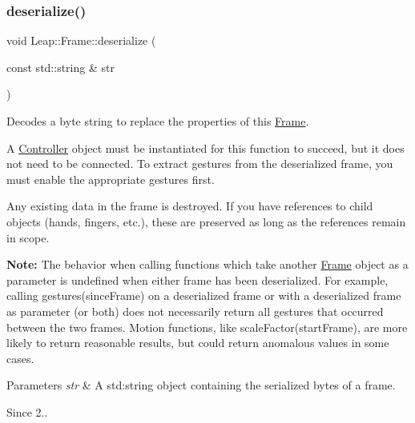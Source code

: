\subsubsection{\texorpdfstring{deserialize()}{deserialize()}}
{\footnotesize\ttfamily void Leap\+::\+Frame\+::deserialize (\begin{DoxyParamCaption}\item[{const std\+::string \&}]{str }\end{DoxyParamCaption})\hspace{0.3cm}{\ttfamily [inline]}}

Decodes a byte string to replace the properties of this \hyperlink{class_leap_1_1_frame}{Frame}.

A \hyperlink{class_leap_1_1_controller}{Controller} object must be instantiated for this function to succeed, but it does not need to be connected. To extract gestures from the deserialized frame, you must enable the appropriate gestures first.

Any existing data in the frame is destroyed. If you have references to child objects (hands, fingers, etc.), these are preserved as long as the references remain in scope.


\begin{DoxyCodeInclude}
\end{DoxyCodeInclude}


{\bfseries Note\+:} The behavior when calling functions which take another \hyperlink{class_leap_1_1_frame}{Frame} object as a parameter is undefined when either frame has been deserialized. For example, calling {\ttfamily gestures(since\+Frame)} on a deserialized frame or with a deserialized frame as parameter (or both) does not necessarily return all gestures that occurred between the two frames. Motion functions, like {\ttfamily scale\+Factor(start\+Frame)}, are more likely to return reasonable results, but could return anomalous values in some cases.


\begin{DoxyParams}{Parameters}
{\em str} & A std\+:string object containing the serialized bytes of a frame.\\
\hline
\end{DoxyParams}
\begin{DoxySince}{Since}
2.. 
\end{DoxySince}
\mbox{\label{class_leap_1_1_frame_aca038c853f530defa0fd551146e54259}} 
